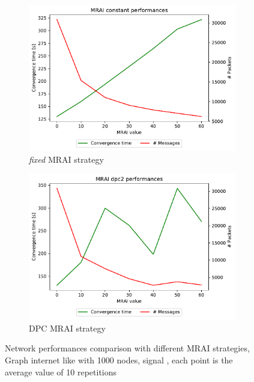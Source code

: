 \begin{figure}[h]
     \centering
     \begin{subfigure}[b]{0.49\textwidth}
         \centering
         \includegraphics[width=\textwidth]{images/internet_like/1000/signals/AWAWA/constant/internet_like-constant_AWAWA_mrai_evolution.pdf}
		 \caption{\textit{fixed} \ac{MRAI} strategy}
         \label{fig:internet_like_1000_fixed_AWAWA}
     \end{subfigure}
     \hfill
     \begin{subfigure}[b]{0.49\textwidth}
         \centering
         \includegraphics[width=\textwidth]{images/internet_like/1000/signals/AWAWA/dpc/internet_like-DPC_AWAWA_mrai_evolution.pdf}
		 \caption{\ac{DPC} \ac{MRAI} strategy}
         \label{fig:internet_like_1000_dpc_AWAWA}
     \end{subfigure}
	 \caption{Network performances comparison with different \ac{MRAI} strategies,
		Graph internet like with \num{1000} nodes, signal , each point is
		the average value of \num{10} repetitions}
        \label{fig:internt_like_1000_evolution_AWAWA}
\end{figure}


